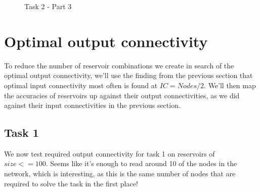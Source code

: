 \begin{figure*}[ht]
    \centering
    \resizebox{\textwidth}{!}{
        \subfloat[N=70]{
            
        }
        \subfloat[N=75]{
            
        }
    }
    \resizebox{\textwidth}{!}{
        \subfloat[N=80]{
            
        }
        \subfloat[N=85]{
            
        }
    }
    \resizebox{\textwidth}{!}{
        \subfloat[N=90]{
            
        }
        \subfloat[N=95]{
            
        }
    }
    \resizebox{0.5\textwidth}{!}{
        \subfloat[N=100]{
            
        }
    }
    \caption{Task 2 - Part 3}
\end{figure*}

\section{Optimal output connectivity}

To reduce the number of reservoir combinations we create in search of the optimal output connectivity,
we'll use the finding from the previous section that optimal input connectivity most often is found at $IC=Nodes/2$.
We'll then map the accuracies of reservoirs up against their output connectivities, as we did against their input connectivities in the previous section.

\subsection{Task 1}

We now test required output connectivity for task 1 on reservoirs of $size <= 100$.
Seems like it's enough to read around 10 of the nodes in the network,
which is interesting, as this is the same number of nodes that are required to solve the task in the first place!

